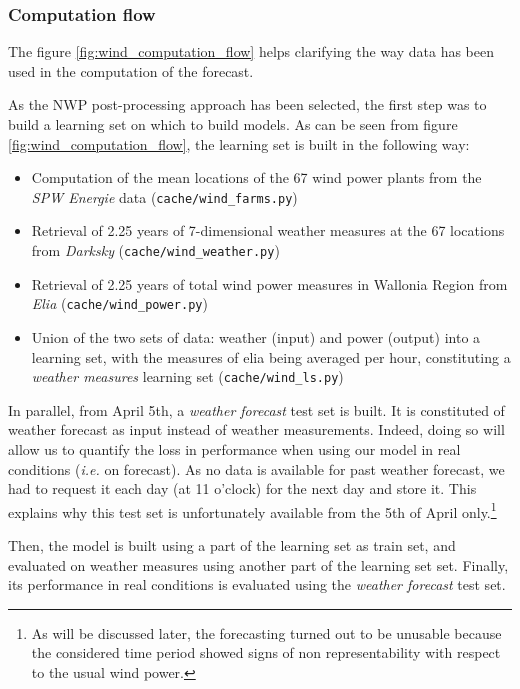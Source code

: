\documentclass[a4paper, 12pt]{article}
\begin{document}
	\subsubsection{Computation flow}

	The figure \ref{fig:wind_computation_flow} helps clarifying the way data has been used in the computation of the forecast.

	As the NWP post-processing approach has been selected, the first step was to build a learning set on which to build models. As can be seen from figure \ref{fig:wind_computation_flow}, the learning set is built in the following way:
	\begin{itemize}
		\item Computation of the mean locations of the 67 wind power plants from the \emph{SPW Energie} data (\texttt{cache/wind\_farms.py})
		\item Retrieval of 2.25 years of 7-dimensional weather measures at the 67 locations from \emph{Darksky} (\texttt{cache/wind\_weather.py})
		\item Retrieval of 2.25 years of total wind power measures in Wallonia Region from \emph{Elia} (\texttt{cache/wind\_power.py})
		\item Union of the two sets of data: weather (input) and power (output) into a learning set, with the measures of elia being averaged per hour, constituting a \emph{weather measures} learning set (\texttt{cache/wind\_ls.py})
	\end{itemize}

	In parallel, from April 5th, a \emph{weather forecast} test set is built. It is constituted of weather forecast as input instead of weather measurements. Indeed, doing so will allow us to quantify the loss in performance when using our model in real conditions (\textit{i.e.} on forecast). As no data is available for past weather forecast, we had to request it each day (at 11 o'clock) for the next day and store it. This explains why this test set is unfortunately available from the 5th of April only.\footnote{As will be discussed later, the forecasting turned out to be unusable because the considered time period showed signs of non representability with respect to the usual wind power.}

	Then, the model is built using a part of the learning set as train set, and evaluated on weather measures using another part of the learning set set. Finally, its performance in real conditions is evaluated using the \emph{weather forecast} test set.
\end{document}
